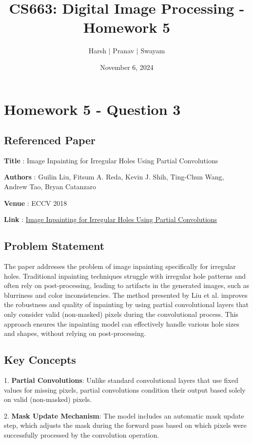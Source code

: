 \documentclass{article}
\title{CS663: Digital Image Processing - Homework 5}
\author{Harsh $\vert$ Pranav $\vert$ Swayam}
\date{November 6, 2024}
\begin{document}
\maketitle
\flushleft
\section*{Homework 5 - Question 3}

\subsection*{Referenced Paper}

\textbf{Title} : Image Inpainting for Irregular Holes Using Partial Convolutions

\textbf{Authors} : Guilin Liu, Fitsum A. Reda, Kevin J. Shih, Ting-Chun Wang, Andrew Tao, Bryan Catanzaro

\textbf{Venue} : ECCV 2018

\textbf{Link} : \href{https://openaccess.thecvf.com/content_ECCV_2018/papers/Guilin_Liu_Image_Inpainting_for_ECCV_2018_paper.pdf}{Image Inpainting for Irregular Holes Using Partial Convolutions}

\subsection*{Problem Statement}

The paper addresses the problem of image inpainting specifically for irregular holes. Traditional inpainting techniques struggle with irregular hole patterns and often rely on post-processing, leading to artifacts in the generated images, such as blurriness and color inconsistencies. The method presented by Liu et al. improves the robustness and quality of inpainting by using partial convolutional layers that only consider valid (non-masked) pixels during the convolutional process. This approach ensures the inpainting model can effectively handle various hole sizes and shapes, without relying on post-processing.

\subsection*{Key Concepts}

1. \textbf{Partial Convolutions}: Unlike standard convolutional layers that use fixed values for missing pixels, partial convolutions condition their output based solely on valid (non-masked) pixels.

2. \textbf{Mask Update Mechanism}: The model includes an automatic mask update step, which adjusts the mask during the forward pass based on which pixels were successfully processed by the convolution operation.
\end{document}
